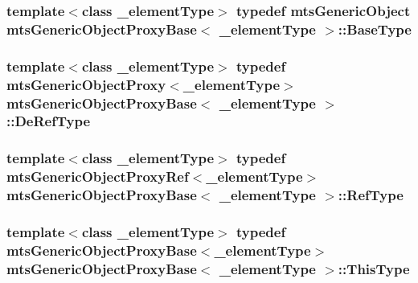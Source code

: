 \subsubsection[{Base\+Type}]{\setlength{\rightskip}{0pt plus 5cm}template$<$class \+\_\+element\+Type$>$ typedef {\bf mts\+Generic\+Object} {\bf mts\+Generic\+Object\+Proxy\+Base}$<$ \+\_\+element\+Type $>$\+::{\bf Base\+Type}}\label{classmts_generic_object_proxy_base_a61a6c330998d8ba0923ff57f0a30b81e}
\hypertarget{classmts_generic_object_proxy_base_ac87827bf98fee558160a8985c41f4126}{}
\subsubsection[{De\+Ref\+Type}]{\setlength{\rightskip}{0pt plus 5cm}template$<$class \+\_\+element\+Type$>$ typedef {\bf mts\+Generic\+Object\+Proxy}$<$\+\_\+element\+Type$>$ {\bf mts\+Generic\+Object\+Proxy\+Base}$<$ \+\_\+element\+Type $>$\+::{\bf De\+Ref\+Type}}\label{classmts_generic_object_proxy_base_ac87827bf98fee558160a8985c41f4126}
\hypertarget{classmts_generic_object_proxy_base_adddd01c8aea004bf5f0a5894438970c9}{}
\subsubsection[{Ref\+Type}]{\setlength{\rightskip}{0pt plus 5cm}template$<$class \+\_\+element\+Type$>$ typedef {\bf mts\+Generic\+Object\+Proxy\+Ref}$<$\+\_\+element\+Type$>$ {\bf mts\+Generic\+Object\+Proxy\+Base}$<$ \+\_\+element\+Type $>$\+::{\bf Ref\+Type}}\label{classmts_generic_object_proxy_base_adddd01c8aea004bf5f0a5894438970c9}
\hypertarget{classmts_generic_object_proxy_base_adfa837044848485e7241e56816a74083}{}
\subsubsection[{This\+Type}]{\setlength{\rightskip}{0pt plus 5cm}template$<$class \+\_\+element\+Type$>$ typedef {\bf mts\+Generic\+Object\+Proxy\+Base}$<$\+\_\+element\+Type$>$ {\bf mts\+Generic\+Object\+Proxy\+Base}$<$ \+\_\+element\+Type $>$\+::{\bf This\+Type}}\label{classmts_generic_object_proxy_base_adfa837044848485e7241e56816a74083}
\hypertarget{classmts_generic_object_proxy_base_a82246d737da0e0bfb1710f63f6afa34b}{}
